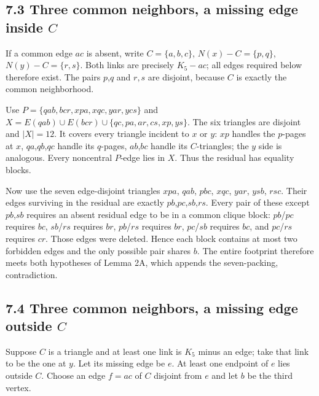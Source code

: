 \documentclass[11pt]{article}
\begin{document}
\subsection{\texorpdfstring{7.3 Three common neighbors, a missing edge
inside
\(C\)}{7.3 Three common neighbors, a missing edge inside C}}\label{three-common-neighbors-a-missing-edge-inside-c}

If a common edge \(ac\) is absent, write \(C=\{a,b,c\}\),
\(N(x)-C=\{p,q\}\), \(N(y)-C=\{r,s\}\). Both links are precisely
\(K_5-ac\); all edges required below therefore exist. The pairs
\(p\),\(q\) and \(r,s\) are disjoint, because \(C\) is exactly the
common neighborhood.

Use \(P=\{qab,bcr,xpa,xqc,yar,ycs\}\) and
\(X=E(qab)\cup E(bcr)\cup \{qc,pa,ar,cs,xp,ys\}\). The six triangles are
disjoint and \(|X|=12\). It covers every triangle incident to \(x\) or
\(y\): \(xp\) handles the \(p\)-pages at \(x\), \(qa\),\(qb\),\(qc\)
handle its \(q\)-pages, \(ab\),\(bc\) handle its \(C\)-triangles; the
\(y\) side is analogous. Every noncentral \(P\)-edge lies in \(X\). Thus
the residual has equality blocks.

Now use the seven edge-disjoint triangles \(xpa\), \(qab\), \(pbc\),
\(xqc\), \(yar\), \(ysb\), \(rsc\). Their edges surviving in the
residual are exactly \(pb\),\(pc\),\(sb\),\(rs\). Every pair of these
except \(pb\),\(sb\) requires an absent residual edge to be in a common
clique block: \(pb\)/\(pc\) requires \(bc\), \(sb\)/\(rs\) requires
\(br\), \(pb\)/\(rs\) requires \(br\), \(pc\)/\(sb\) requires \(bc\),
and \(pc\)/\(rs\) requires \(cr\). Those edges were deleted. Hence each
block contains at most two forbidden edges and the only possible pair
shares \(b\). The entire footprint therefore meets both hypotheses of
Lemma 2A, which appends the seven-packing, contradiction.

\subsection{\texorpdfstring{7.4 Three common neighbors, a missing edge
outside
\(C\)}{7.4 Three common neighbors, a missing edge outside C}}\label{three-common-neighbors-a-missing-edge-outside-c}

Suppose \(C\) is a triangle and at least one link is \(K_5\) minus an
edge; take that link to be the one at \(y\). Let its missing edge be
\(e\). At least one endpoint of \(e\) lies outside \(C\). Choose an edge
\(f=ac\) of \(C\) disjoint from \(e\) and let \(b\) be the third vertex.
\end{document}

